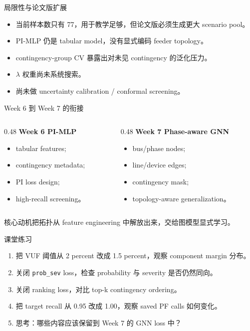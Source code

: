 \documentclass[aspectratio=169,11pt]{beamer}
\begin{document}
\begin{frame}{局限性与论文版扩展}
\begin{itemize}
  \item 当前样本数只有 77，用于教学足够，但论文版必须生成更大 scenario pool。
  \item PI-MLP 仍是 tabular model，没有显式编码 feeder topology。
  \item contingency-group CV 暴露出对未见 contingency 的泛化压力。
  \item $\lambda$ 权重尚未系统搜索。
  \item 尚未做 uncertainty calibration / conformal screening。
\end{itemize}
\end{frame}

\begin{frame}{Week 6 到 Week 7 的衔接}
\begin{columns}
\begin{column}{0.48\textwidth}
\textbf{Week 6 PI-MLP}
\begin{itemize}
  \item tabular features;
  \item contingency metadata;
  \item PI loss design;
  \item high-recall screening。
\end{itemize}
\end{column}
\begin{column}{0.48\textwidth}
\textbf{Week 7 Phase-aware GNN}
\begin{itemize}
  \item bus/phase nodes;
  \item line/device edges;
  \item contingency mask;
  \item topology-aware generalization。
\end{itemize}
\end{column}
\end{columns}
\begin{block}{核心动机}把拓扑从 feature engineering 中解放出来，交给图模型显式学习。\end{block}
\end{frame}

\begin{frame}{课堂练习}
\begin{enumerate}
  \item 把 VUF 阈值从 2 percent 改成 1.5 percent，观察 component margin 分布。
  \item 关闭 \texttt{prob\_sev} loss，检查 probability 与 severity 是否仍然同向。
  \item 关闭 ranking loss，对比 top-k contingency ordering。
  \item 把 target recall 从 0.95 改成 1.00，观察 saved PF calls 如何变化。
  \item 思考：哪些内容应该保留到 Week 7 的 GNN loss 中？
\end{enumerate}
\end{frame}
\end{document}
